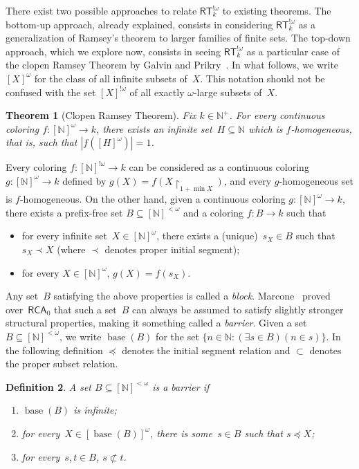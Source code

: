 \documentclass{article}
\newcommand{\uh}{\upharpoonright}
\newcommand{\RCA}[0]{\mathsf{RCA}}
\newcommand{\RT}[0]{\mathsf{RT}}
\newcommand{\NN}[0]{\mathbb{N}}
\newcommand{\base}{\operatorname{base}}
\newtheorem{theorem}{Theorem}
\numberwithin{theorem}{section}
\newtheorem{definition}[theorem]{Definition}
\begin{document}
There exist two possible approaches to relate $\RT^{!\omega}_k$ to existing theorems. The bottom-up approach, already explained, consists in considering $\RT^{!\omega}_k$ as a generalization of Ramsey's theorem to larger families of finite sets. The top-down approach, which we explore now, consists in seeing $\RT^{!\omega}_k$ as a particular case of the clopen Ramsey Theorem by Galvin and Prikry~\cite{galvinBorelSetsRamsey1973}. In what follows, we write $[X]^\omega$ for the class of all infinite subsets of~$X$. This notation should not be confused with the set $[X]^{!\omega}$ of all exactly $\omega$-large subsets of~$X$.

\begin{theorem}[Clopen Ramsey Theorem]
Fix $k \in \NN^+$.
For every continuous coloring $f : [\NN]^\omega \to k$, there exists an infinite set~$H \subseteq \NN$
which is \emph{$f$-homogeneous}, that is, such that $|f([H]^\omega)| = 1$.
\end{theorem}

Every coloring $f : [\NN]^{!\omega} \to k$ can be considered as a continuous coloring $g : [\NN]^\omega \to k$
defined by $g(X) = f(X \uh_{1+\min X})$, and every $g$-homogeneous set is $f$-homogeneous.
On the other hand, given a continuous coloring $g : [\NN]^\omega \to k$, there exists a prefix-free set $B \subseteq [\NN]^{<\omega}$ and a coloring $f : B \to k$ such that 
\begin{itemize}
    \item[(1)] for every infinite set~$X \in [\NN]^\omega$, there exists a (unique)~$s_X \in B$ such that $s_X \prec X$ (where $\prec$ denotes proper initial segment);
    \item[(2)] for every $X \in [\NN]^\omega$, $g(X) = f(s_X)$.
\end{itemize}
Any set~$B$ satisfying the above properties is called a \emph{block}.
Marcone~\cite{marcone2005wqo} proved over~$\RCA_0$ that such a set~$B$ can always be assumed to satisfy slightly stronger structural properties, making it something called a \emph{barrier}. Given a set~$B \subseteq [\NN]^{<\omega}$, we write $\base(B)$ for the set $\{ n \in \NN : (\exists s \in B)(n \in s) \}$. In the following definition $\preceq$ denotes the initial segment relation and $\subset$ denotes the proper subset relation.

\begin{definition}
A set $B \subseteq [\NN]^{<\omega}$ is a \emph{barrier} if
\begin{enumerate}
    \item[(1)] $\base(B)$ is infinite;
    \item[(2)] for every~$X \in [\base(B)]^\omega$, there is some~$s \in B$ such that $s \preceq X$;
    \item[(3)] for every~$s, t \in B$, $s \not \subset t$.
\end{enumerate}
\end{definition}
\end{document}
